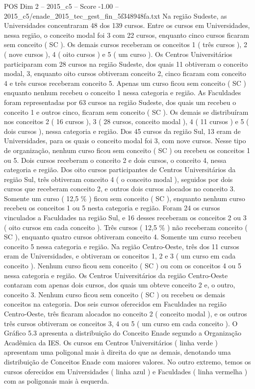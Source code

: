 \begin{textsample}{POS Dim 2 – 2015\_c5 – Score -1.00 – 2015\_c5/enade\_2015\_tec\_gest\_fin\_5f348948fa.txt}
Na região Sudeste, as Universidades concentraram 48 dos 139 cursos.
Entre os cursos em Universidades, nessa região, o conceito modal foi 3 com 22 cursos, enquanto cinco cursos ficaram sem conceito ( SC ).
Os demais cursos receberam os conceitos 1 ( três cursos ), 2 ( nove cursos ), 4 ( oito cursos ) e 5 ( um curso ).
Os Centros Universitários participaram com 28 cursos na região Sudeste, dos quais 11 obtiveram o conceito modal, 3, enquanto oito cursos obtiveram conceito 2, cinco ficaram com conceito 4 e três cursos receberam conceito 5.
Apenas um curso ficou sem conceito ( SC ) enquanto nenhum recebeu o conceito 1 nessa categoria e região.
As Faculdades foram representadas por 63 cursos na região Sudeste, dos quais um recebeu o conceito 1 e outros cinco, ficaram sem conceito ( SC ).
Os demais se distribuíram nos conceitos 2 ( 16 cursos ), 3 ( 28 cursos, conceito modal ), 4 ( 11 cursos ) e 5 ( dois cursos ), nessa categoria e região.
Dos 45 cursos da região Sul, 13 eram de Universidades, para os quais o conceito modal foi 3, com nove cursos.
Nesse tipo de organização, nenhum curso ficou sem conceito ( SC ) ou recebeu os conceitos 1 ou 5.
Dois cursos receberam o conceito 2 e dois cursos, o conceito 4, nessa categoria e região.
Dos oito cursos participantes de Centros Universitários da região Sul, três obtiveram conceito 4 ( o conceito modal ), seguidos por dois cursos que receberam conceito 2, e outros dois cursos alocados no conceito 3.
Somente um curso ( 12,5 \% ) ficou sem conceito ( SC ), enquanto nenhum curso recebeu os conceitos 1 ou 5 nesta categoria e região.
Foram 24 os cursos vinculados a Faculdades na região Sul, e 16 desses receberam os conceitos 2 ou 3 ( oito cursos em cada conceito ).
Três cursos ( 12,5 \% ) não receberam conceito ( SC ), enquanto quatro cursos obtiveram conceito 4.
Somente um curso recebeu conceito 5 nessa categoria e região.
Na região Centro-Oeste, três dos 11 cursos eram de Universidades, e obtiveram os conceitos 1, 2 e 3 ( um curso em cada conceito ).
Nenhum curso ficou sem conceito ( SC ) ou com os conceitos 4 ou 5 nessa categoria e região.
Os Centros Universitários da região Centro-Oeste contaram com apenas dois cursos, dos quais um obteve conceito 2 e, o outro, conceito 3.
Nenhum curso ficou sem conceito ( SC ) ou recebeu os demais conceitos na categoria.
Dos seis cursos oferecidos em Faculdades na região Centro-Oeste, três ficaram alocados no conceito 2 ( conceito modal ), e os outros três cursos obtiveram os conceitos 3, 4 ou 5 ( um curso em cada conceito ).
O Gráfico 5.3 apresenta a distribuição do Conceito Enade segundo a Organização Acadêmica da IES.
Os cursos em Centros Universitários ( linha verde ) apresentam uma poligonal mais à direita do que as demais, denotando uma distribuição de Conceitos Enade com maiores valores.
No outro extremo, temos os cursos oferecidos em Universidades ( linha azul ) e Faculdades ( linha vermelha ) com as poligonais mais à esquerda.

\end{textsample}
